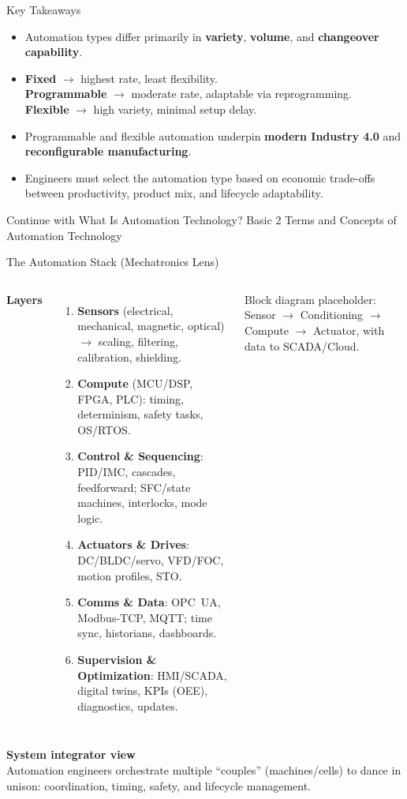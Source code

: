\begin{frame}{Key Takeaways}
\begin{itemize}
  \item Automation types differ primarily in \textbf{variety}, \textbf{volume}, and \textbf{changeover capability}.
  \item \textbf{Fixed} $\rightarrow$ highest rate, least flexibility.\\
        \textbf{Programmable} $\rightarrow$ moderate rate, adaptable via reprogramming.\\
        \textbf{Flexible} $\rightarrow$ high variety, minimal setup delay.
  \item Programmable and flexible automation underpin \textbf{modern Industry 4.0} and \textbf{reconfigurable manufacturing}.
  \item Engineers must select the automation type based on economic trade-offs between productivity, product mix, and lifecycle adaptability.
\end{itemize}

Continue with What Is Automation Technology? Basic 2
Terms and Concepts of Automation
Technology
\end{frame}


\begin{frame}{The Automation Stack (Mechatronics Lens)}
\begin{columns}[T,onlytextwidth]
\textbf{Layers}
\begin{enumerate}
  \item \textbf{Sensors} (electrical, mechanical, magnetic, optical) $\rightarrow$ scaling, filtering, calibration, shielding.
  \item \textbf{Compute} (MCU/DSP, FPGA, PLC): timing, determinism, safety tasks, OS/RTOS.
  \item \textbf{Control \& Sequencing}: PID/IMC, cascades, feedforward; SFC/state machines, interlocks, mode logic.
  \item \textbf{Actuators \& Drives}: DC/BLDC/servo, VFD/FOC, motion profiles, STO.
  \item \textbf{Comms \& Data}: OPC~UA, Modbus‐TCP, MQTT; time sync, historians, dashboards.
  \item \textbf{Supervision \& Optimization}: HMI/SCADA, digital twins, KPIs (OEE), diagnostics, updates.
\end{enumerate}

\centering
\footnotesize{Block diagram placeholder: Sensor $\to$ Conditioning $\to$ Compute $\to$ Actuator, with data to SCADA/Cloud.}
\end{columns}

\vspace{1mm}
\textbf{System integrator view} \\
Automation engineers orchestrate multiple “couples” (machines/cells) to dance in unison: coordination, timing, safety, and lifecycle management.
\end{frame}


